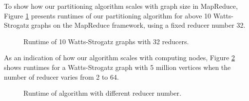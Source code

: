 \documentclass{acm_proc_article-sp}
\begin{document}
To show how our partitioning algorithm scales with graph size in MapReduce, Figure \ref{fig:runtime} presents runtimes of our partitioning algorithm for above 10 Watts-Strogatz graphs on the MapReduce framework, using a fixed reducer number 32.
\begin{figure}
\centering
{}
\caption{Runtime of 10 Watts-Strogatz graphs with 32 reducers. }
\label{fig:runtime}
\end{figure}
As an indication of how our algorithm scales with computing nodes, Figure \ref{fig:reducerNum} shows runtimes for a Watts-Strogatz graph with 5 million vertices when the number of reducer varies from 2 to 64.
\begin{figure}
\centering
{}
\caption{Runtime of algorithm with different reducer number.}
\label{fig:reducerNum}
\end{figure}
\end{document}
